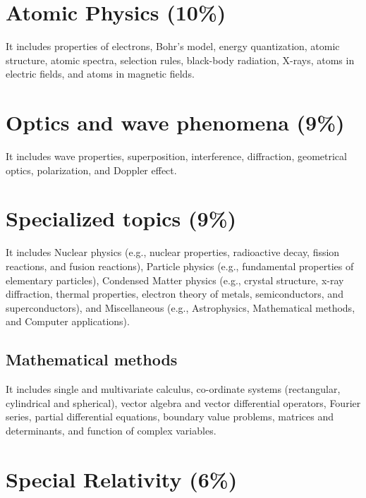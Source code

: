 \documentclass[12pt,a4paper]{article}
\begin{document}
\section{Atomic Physics (10\%)}

It includes properties of electrons, Bohr's model, energy quantization, atomic structure, atomic spectra, selection rules, black-body radiation, X-rays, atoms in electric fields, and atoms in magnetic fields.


\section{Optics and wave phenomena (9\%)}

It includes wave properties, superposition, interference, diffraction, geometrical optics, polarization, and Doppler effect.


\section{Specialized topics (9\%)}

It includes Nuclear physics (e.g., nuclear properties, radioactive decay, fission reactions, and fusion reactions), Particle physics (e.g., fundamental properties of elementary particles), Condensed Matter physics (e.g., crystal structure, x-ray diffraction, thermal properties, electron theory of metals, semiconductors, and superconductors), and Miscellaneous (e.g., Astrophysics, Mathematical methods, and Computer applications). 

\subsection{Mathematical methods}

It includes single and multivariate calculus, co-ordinate systems (rectangular, cylindrical and spherical), vector algebra and vector differential operators, Fourier series, partial differential equations, boundary value problems, matrices and determinants, and function of complex variables.


\section{Special Relativity (6\%)}
\end{document}
